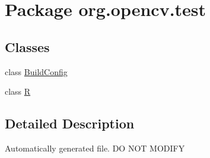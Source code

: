 \hypertarget{namespaceorg_1_1opencv_1_1test}{}\section{Package org.\+opencv.\+test}
\label{namespaceorg_1_1opencv_1_1test}
\subsection*{Classes}
\begin{DoxyCompactItemize}
\item 
class \mbox{\hyperlink{classorg_1_1opencv_1_1test_1_1_build_config}{Build\+Config}}
\item 
class \mbox{\hyperlink{classorg_1_1opencv_1_1test_1_1_r}{R}}
\end{DoxyCompactItemize}


\subsection{Detailed Description}
Automatically generated file. DO N\+OT M\+O\+D\+I\+FY 